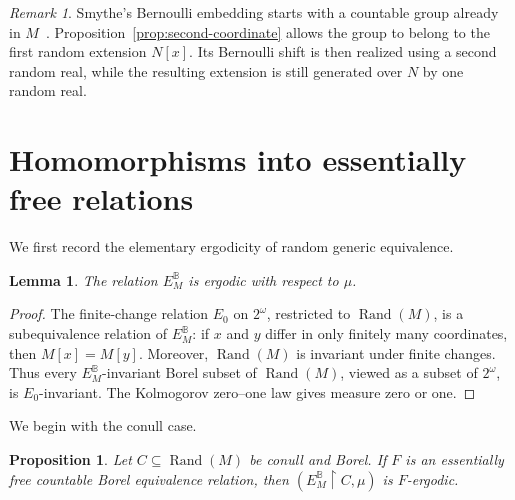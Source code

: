 \documentclass[11pt]{amsart}
\newtheorem{lemma}[theorem]{Lemma}
\newtheorem{proposition}[theorem]{Proposition}
\theoremstyle{definition}
\theoremstyle{remark}
\newtheorem{remark}[theorem]{Remark}
\newcommand{\B}{\mathbb B}
\newcommand{\Rand}{\operatorname{Rand}}
\newcommand{\restr}{\mathbin{\upharpoonright}}
\newcommand{\EBM}{E^{\B}_{M}}
\begin{document}
\begin{remark}
Smythe's Bernoulli embedding starts with a countable group already in $M$~\cite[Theorem~4.3]{Smythe}.  Proposition~\ref{prop:second-coordinate} allows the group to belong to the first random extension $N[x]$.  Its Bernoulli shift is then realized using a second random real, while the resulting extension is still generated over $N$ by one random real.
\end{remark}

\section{Homomorphisms into essentially free relations}

We first record the elementary ergodicity of random generic equivalence.

\begin{lemma}\label{lem:E-ergodic}
The relation $\EBM$ is ergodic with respect to $\mu$.
\end{lemma}

\begin{proof}
The finite-change relation $E_0$ on $2^\omega$, restricted to $\Rand(M)$, is a subequivalence relation of $\EBM$: if $x$ and $y$ differ in only finitely many coordinates, then $M[x]=M[y]$.  Moreover, $\Rand(M)$ is invariant under finite changes.  Thus every $\EBM$-invariant Borel subset of $\Rand(M)$, viewed as a subset of $2^\omega$, is $E_0$-invariant.  The Kolmogorov zero--one law gives measure zero or one.
\end{proof}

We begin with the conull case.

\begin{proposition}\label{prop:conull-ergodicity}
Let $C\subseteq\Rand(M)$ be conull and Borel.  If $F$ is an essentially free countable Borel equivalence relation, then $(\EBM\restr C,\mu)$ is $F$-ergodic.
\end{proposition}
\end{document}
